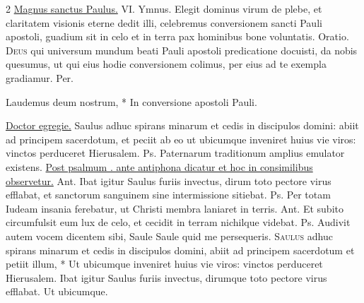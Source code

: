 \begin{multicols*}{2}
\newline \R \hyperlink{magnus-sanctus-paulus}{Magnus sanctus Paulus.} {\color{Red} VI. Ymnus.}
 Elegit dominus virum de plebe, et claritatem visionis eterne dedit illi, celebremus conversionem sancti Pauli apostoli, guadium sit in celo et in terra pax hominibus bone voluntatis. {\color{Red} Oratio.}
\lettrine[lines=2]{\zallmancaps \color{Blue} D}{eus} qui universum mundum beati Pauli apostoli predicatione docuisti, da nobis quesumus, ut qui eius hodie conversionem colimus, per eius ad te exempla gradiamur. Per.
\begin{invitatory}
{Laudemus deum nostrum, * In conversione apostoli Pauli.}
\end{invitatory}
 \hyperlink{doctor-egregie-paule}{Doctor egregie.}
 Saulus adhuc spirans minarum et cedis in discipulos domini: abiit ad principem sacerdotum, et peciit ab eo ut ubicumque inveniret huius vie viros: vinctos perduceret Hierusalem. {\color{Red} Ps.}  \V Paternarum traditionum amplius emulator existens.
\newline \ul{Post psalmum \Vbar . ante antiphona dicatur et hoc in consimilibus observetur.}
{\color{Red} Ant.} Ibat igitur Saulus furiis invectus, dirum toto pectore virus efflabat, et sanctorum sanguinem sine intermissione sitiebat. {\color{Red} Ps.}  \V Per totam Iudeam insania ferebatur, ut Christi membra laniaret in terris. {\color{Red} Ant.} Et subito circumfulsit eum lux de celo, et cecidit in terram nichilque videbat. {\color{Red} Ps.}  \V Audivit autem vocem dicentem sibi, Saule Saule quid me persequeris. \R
\lettrine[lines=2]{\zallmancaps \color{Red} S}{aulus} \hypertarget{saulus-adhuc}{\label{saulus-adhuc}} adhuc spirans minarum et cedis in discipulos domini, abiit ad principem sacerdotum et petiit illum, * Ut ubicumque inveniret huius vie viros: vinctos perduceret Hierusalem. \V Ibat igitur Saulus furiis invectus, dirumque toto pectore virus efflabat. Ut ubicumque.

\end{multicols*}
